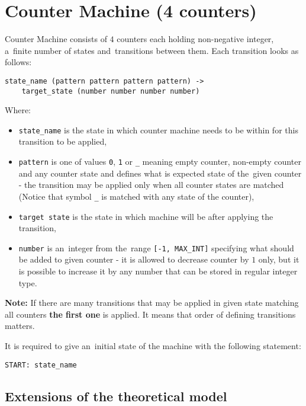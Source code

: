 \documentclass[english,shortabstract,mgr]{iithesis}
\begin{document}
\section {Counter Machine (4 counters)}

Counter Machine consists of $4$ counters each holding non-negative integer,
a~finite number of states and~transitions between them. Each transition
looks as follows:

\begin{verbatim}
state_name (pattern pattern pattern pattern) ->
    target_state (number number number number)
\end{verbatim}

Where:
\begin{itemize}
  \item \texttt{state\_name} is the state in which counter machine needs to be
      within for this transition to be applied,
  \item \texttt{pattern} is one of values \texttt{0}, \texttt{1} or \texttt{\_}
      meaning empty counter, non-empty counter and any counter state and defines
      what is expected state of the~given counter - the transition may be applied
      only when all counter states are matched (Notice that symbol \texttt{\_}
      is matched with any state of the counter),
  \item \texttt{target state} is the state in which machine will be after
      applying the transition,
  \item \texttt{number} is an~integer from the~range \texttt{[-1, MAX\_INT]} specifying
      what should be added to given counter - it is allowed to decrease counter
      by $1$ only, but it is possible to increase it by any number that can be stored
      in regular integer type.
\end{itemize}

\textbf{Note:} If there are many transitions that may be applied in given state
matching all counters \textbf{the first one} is applied. It means that order
of defining transitions matters.

It is required to give an~initial state of the machine with the following statement:
\begin{verbatim}
START: state_name
\end{verbatim}

\subsection {Extensions of the theoretical model}
\end{document}
